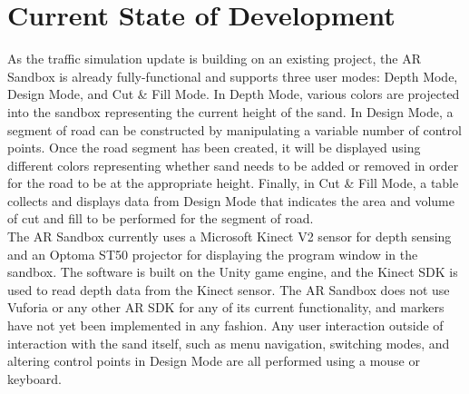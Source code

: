\documentclass[letterpaper, 10pt, onecolumn, draftclsnofoot]{IEEEtran}
\begin{document}

\section{Current State of Development}
    As the traffic simulation update is building on an existing project, the AR Sandbox is already fully-functional and supports three user modes: Depth Mode, Design Mode, and Cut \& Fill Mode. In Depth Mode, various colors are projected into the sandbox representing the current height of the sand. In Design Mode, a segment of road can be constructed by manipulating a variable number of control points.\cite{OrgOSUSandbox} Once the road segment has been created, it will be displayed using different colors representing whether sand needs to be added or removed in order for the road to be at the appropriate height. Finally, in Cut \& Fill Mode, a table collects and displays data from Design Mode that indicates the area and volume of cut and fill to be performed for the segment of road. \\
    
    The AR Sandbox currently uses a Microsoft Kinect V2 sensor for depth sensing and an Optoma ST50 projector for displaying the program window in the sandbox. The software is built on the Unity game engine, and the Kinect SDK is used to read depth data from the Kinect sensor. The AR Sandbox does not use Vuforia or any other AR SDK for any of its current functionality, and markers have not yet been implemented in any fashion. Any user interaction outside of interaction with the sand itself, such as menu navigation, switching modes, and altering control points in Design Mode are all performed using a mouse or keyboard. 

\end{document}
